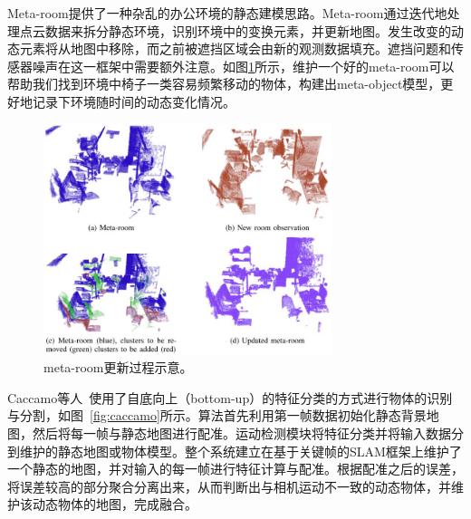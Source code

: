 Meta-room\cite{Ambrus2014Meta}提供了一种杂乱的办公环境的静态建模思路。Meta-room通过迭代地处理点云数据来拆分静态环境，识别环境中的变换元素，并更新地图。发生改变的动态元素将从地图中移除，而之前被遮挡区域会由新的观测数据填充。遮挡问题和传感器噪声在这一框架中需要额外注意。如图\ref{fig:Meta-room-updating}所示，维护一个好的meta-room可以帮助我们找到环境中椅子一类容易频繁移动的物体，构建出meta-object模型，更好地记录下环境随时间的动态变化情况。

\begin{figure}[htbp]
	\centering
	\includegraphics[width=0.75\textwidth]{figs/2-3/meta-room.jpg}
	\caption{meta-room更新过程示意。}
	\label{fig:Meta-room-updating}
\end{figure}

Caccamo等人~\cite{2017Joint3D}使用了自底向上（bottom-up）的特征分类的方式进行物体的识别与分割，如图~\ref{fig:caccamo}所示。算法首先利用第一帧数据初始化静态背景地图，然后将每一帧与静态地图进行配准。运动检测模块将特征分类并将输入数据分到维护的静态地图或物体模型。整个系统建立在基于关键帧的SLAM框架上维护了一个静态的地图，并对输入的每一帧进行特征计算与配准。根据配准之后的误差，将误差较高的部分聚合分离出来，从而判断出与相机运动不一致的动态物体，并维护该动态物体的地图，完成融合。

